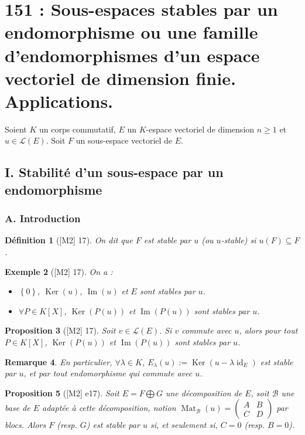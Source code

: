 \documentclass[10pt, a4paper, parskip=full, twoside, twocolumn]{report}
\newtheorem{definition}{Définition}
\newtheorem{proposition}[definition]{Proposition}
\newtheorem{example}[definition]{Exemple}
\newtheorem{remark}[definition]{Remarque}
\DeclareMathOperator{\im}{Im}
\DeclareMathOperator{\Ker}{Ker}
\DeclareMathOperator{\Mat}{Mat}
\DeclareMathOperator{\id}{id}
\begin{document}
\chapter*{151 : Sous-espaces stables par un endomorphisme ou une famille d'endomorphismes d'un espace vectoriel de dimension finie. Applications.}
\setcounter{definition}{0}

\textcolor{paragraphtext}{Soient $K$ un corps commutatif, $E$ un $K$-espace vectoriel de dimension $n\geq 1$ et $u\in\mathcal{L}(E)$. 
Soit $F$ un sous-espace vectoriel de $E$.}

\section*{I. Stabilité d'un sous-espace par un endomorphisme}
\subsection*{A. Introduction}

\begin{definition}[\textnormal{[M2] 17}]
	On dit que $F$ est \emph{stable par $u$} (ou \emph{$u$-stable}) si $u(F)\subseteq F$.
\end{definition}

\begin{example}[\textnormal{[M2] 17}]
	On a :
	\begin{itemize}
		\item $\left\{0\right\}$, $\Ker(u)$, $\im(u)$ et $E$ sont stables par $u$.
		\item $\forall P\in K[X]$, $\Ker(P(u))$ et $\im(P(u))$ sont stables par $u$.
	\end{itemize}
\end{example}

\begin{proposition}[\textnormal{[M2] 17}]
	Soit $v\in\mathcal{L}(E)$. Si $v$ commute avec $u$, alors pour tout $P\in K[X]$,
	$\Ker(P(u))$ et $\im(P(u))$ sont stables par $u$.
\end{proposition}

\begin{remark}
	En particulier, $\forall \lambda\in K$, $E_{\lambda}(u) := \Ker(u-\lambda \id_E)$ est 
	stable par $u$, et par tout endomorphisme qui commute avec $u$.
\end{remark}

\begin{proposition}[\textnormal{[M2] e17}]
	Soit $E = F\bigoplus G$ une décomposition de $E$, soit $\mathcal{B}$ une base de $E$ 
	adaptée à cette décomposition, notion $\Mat_{\mathcal{B}}(u) = \begin{pmatrix}
		A & B \\ C & D
	\end{pmatrix}$ par blocs. Alors $F$ (resp. $G$) est stable par $u$ si, et seulement si, $C=0$ (resp. $B = 0$).
\end{proposition}
\end{document}
